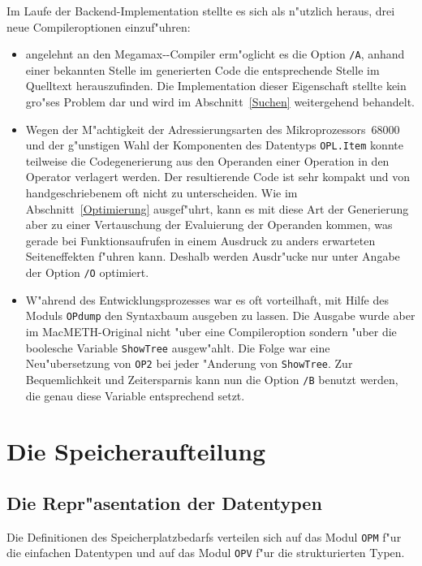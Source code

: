 Im Laufe der Backend-Implementation stellte es sich als n"utzlich heraus,
drei neue Compileroptionen einzuf"uhren:
\begin{itemize}
\item angelehnt an den Megamax-\modula-Compiler erm"oglicht es die Option
  {\tt /A}, anhand einer bekannten Stelle im generierten Code die
  entsprechende Stelle im Quelltext herauszufinden.
  Die Implementation dieser Eigenschaft stellte kein gro"ses Problem dar und
  wird im Abschnitt~\ref{Suchen} weitergehend behandelt.
\item Wegen der M"achtigkeit der Adressierungsarten des Mikroprozessors~68000
  und der g"unstigen Wahl der Komponenten des Datentyps {\tt OPL.Item}
  konnte teilweise die Codegenerierung aus den Operanden einer Operation in
  den Operator verlagert werden.
  Der resultierende Code ist sehr kompakt und von handgeschriebenem oft nicht
  zu unterscheiden.
  Wie im Abschnitt~\ref{Optimierung} ausgef"uhrt, kann es mit diese Art der Generierung
  aber zu einer Vertauschung der Evaluierung der Operanden kommen, was gerade
  bei Funktionsaufrufen in einem Ausdruck zu anders erwarteten Seiteneffekten
  f"uhren kann.
  Deshalb werden Ausdr"ucke nur unter Angabe der Option {\tt /O} optimiert.
\item W"ahrend des Entwicklungsprozesses war es oft vorteilhaft, mit Hilfe
  des Moduls {\tt OPdump} den Syntaxbaum ausgeben zu lassen.
  Die Ausgabe wurde aber im MacMETH-Original nicht "uber eine Compileroption
  sondern "uber die boolesche Variable  {\tt ShowTree} ausgew"ahlt.
  Die Folge war eine Neu"ubersetzung von {\tt OP2} bei jeder "Anderung von
  {\tt ShowTree}.
  Zur Bequemlichkeit und Zeitersparnis kann nun die Option {\tt /B} benutzt
  werden, die genau diese Variable entsprechend setzt.
\end{itemize}

\section{Die Speicheraufteilung}
\label{Speicheraufteilung}

\subsection{Die Repr"asentation der Datentypen}

Die Definitionen des Speicherplatzbedarfs verteilen sich auf das
Modul {\tt OPM} f"ur die einfachen Datentypen und auf das Modul
{\tt OPV} f"ur die strukturierten Typen.

